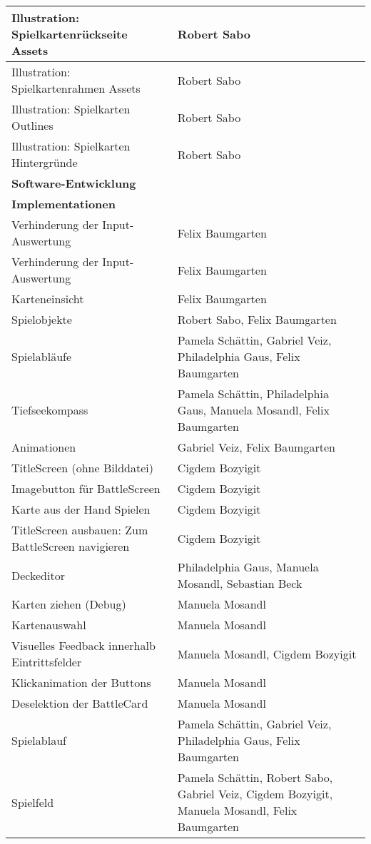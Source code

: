\begin{longtable}{|p{8cm}|p{10cm}|}
Illustration: Spielkartenrückseite Assets & Robert Sabo \\ \hline
Illustration: Spielkartenrahmen Assets & Robert Sabo \\ \hline
Illustration: Spielkarten Outlines & Robert Sabo \\ \hline
Illustration: Spielkarten Hintergründe & Robert Sabo \\ \hline
\textbf{Software-Entwicklung} & \\ \hline
\textbf{Implementationen} & \\ \hline
Verhinderung der Input-Auswertung & Felix Baumgarten \\ \hline
Verhinderung der Input-Auswertung & Felix Baumgarten \\ \hline
Karteneinsicht & Felix Baumgarten \\ \hline
Spielobjekte & Robert Sabo, Felix Baumgarten \\ \hline
Spielabläufe & Pamela Schättin, Gabriel Veiz, Philadelphia Gaus, Felix Baumgarten \\ \hline
Tiefseekompass & Pamela Schättin, Philadelphia Gaus, Manuela Mosandl, Felix Baumgarten \\ \hline
Animationen & Gabriel Veiz, Felix Baumgarten \\ \hline
TitleScreen (ohne Bilddatei) & Cigdem Bozyigit \\ \hline
Imagebutton für BattleScreen & Cigdem Bozyigit \\ \hline
Karte aus der Hand Spielen & Cigdem Bozyigit \\ \hline
TitleScreen ausbauen: Zum BattleScreen navigieren & Cigdem Bozyigit \\ \hline
Deckeditor & Philadelphia Gaus, Manuela Mosandl, Sebastian Beck \\ \hline
Karten ziehen (Debug) & Manuela Mosandl \\ \hline
Kartenauswahl & Manuela Mosandl \\ \hline
Visuelles Feedback innerhalb Eintrittsfelder & Manuela Mosandl, Cigdem Bozyigit \\ \hline
Klickanimation der Buttons & Manuela Mosandl \\ \hline
Deselektion der BattleCard & Manuela Mosandl \\ \hline
Spielablauf & Pamela Schättin, Gabriel Veiz, Philadelphia Gaus, Felix Baumgarten \\ \hline
Spielfeld & Pamela Schättin, Robert Sabo, Gabriel Veiz, Cigdem Bozyigit, Manuela Mosandl, Felix Baumgarten \\ \hline

\end{longtable}
